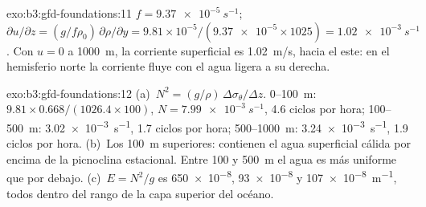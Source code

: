 \begin{solution}{exo:b3:gfd-foundations:11}
$f = \qty{9.37e-5}{s^{-1}}$; $\partial u/\partial z = (g/f\rho_0)\,\partial
\rho/\partial y = 9.81\times10^{-5}/(\num{9.37e-5}\times1025) =
\qty{1.02e-3}{s^{-1}}$. Con $u = 0$ a \qty{1000}{m}, la corriente superficial es
\qty{1.02}{m/s}, hacia el este: en el hemisferio norte la corriente fluye con
el agua ligera a su derecha.
\end{solution}

\begin{solution}{exo:b3:gfd-foundations:12}
(a)~$N^2 = (g/\rho)\,\Delta\sigma_\theta/\Delta z$. 0--\qty{100}{m}:
$9.81\times0.668/(1026.4\times100)$, $N = \qty{7.99e-3}{s^{-1}}$, 4.6
ciclos por hora; 100--\qty{500}{m}: \qty{3.02e-3}{s^{-1}}, 1.7 ciclos por
hora; 500--\qty{1000}{m}: \qty{3.24e-3}{s^{-1}}, 1.9 ciclos por hora.
(b)~Los \qty{100}{m} superiores: contienen el agua superficial cálida por encima
de la picnoclina estacional. Entre 100 y \qty{500}{m} el agua es más
uniforme que por debajo. (c)~$E = N^2/g$ es \num{650e-8}, \num{93e-8} y
\qty{107e-8}{m^{-1}}, todos dentro del rango de la capa superior del océano.
\end{solution}

